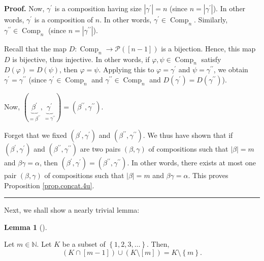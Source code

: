 \documentclass[numbers=enddot,12pt,final,onecolumn,notitlepage]{scrartcl}%
\theoremstyle{definition}
\newtheorem{lem}[theo]{Lemma}
\newenvironment{lemma}[1][]
{\begin{lem}[#1]\begin{leftbar}}
{\end{leftbar}\end{lem}}
\newenvironment{proof}[1][Proof]{\noindent\textbf{#1.} }{\ \rule{0.5em}{0.5em}}
\begin{document}
\begin{proof}
Now, $\gamma^{\prime}$ is a composition having size $\left\vert \gamma
^{\prime}\right\vert =n$ (since $n=\left\vert \gamma^{\prime}\right\vert $).
In other words, $\gamma^{\prime}$ is a composition of $n$. In other words,
$\gamma^{\prime}\in\operatorname*{Comp}\nolimits_{n}$. Similarly,
$\gamma^{\prime\prime}\in\operatorname*{Comp}\nolimits_{n}$ (since
$n=\left\vert \gamma^{\prime\prime}\right\vert $).

Recall that the map $D:\operatorname*{Comp}\nolimits_{n}\rightarrow
\mathcal{P}\left(  \left[  n-1\right]  \right)  $ is a bijection. Hence, this
map $D$ is bijective, thus injective. In other words, if $\varphi,\psi
\in\operatorname*{Comp}\nolimits_{n}$ satisfy $D\left(  \varphi\right)
=D\left(  \psi\right)  $, then $\varphi=\psi$. Applying this to $\varphi
=\gamma^{\prime}$ and $\psi=\gamma^{\prime\prime}$, we obtain $\gamma^{\prime
}=\gamma^{\prime\prime}$ (since $\gamma^{\prime}\in\operatorname*{Comp}%
\nolimits_{n}$ and $\gamma^{\prime\prime}\in\operatorname*{Comp}\nolimits_{n}$
and $D\left(  \gamma^{\prime}\right)  =D\left(  \gamma^{\prime\prime}\right)
$).

Now, $\left(  \underbrace{\beta^{\prime}}_{=\beta^{\prime\prime}%
},\underbrace{\gamma^{\prime}}_{=\gamma^{\prime\prime}}\right)  =\left(
\beta^{\prime\prime},\gamma^{\prime\prime}\right)  $.

Forget that we fixed $\left(  \beta^{\prime},\gamma^{\prime}\right)  $ and
$\left(  \beta^{\prime\prime},\gamma^{\prime\prime}\right)  $. We thus have
shown that if $\left(  \beta^{\prime},\gamma^{\prime}\right)  $ and $\left(
\beta^{\prime\prime},\gamma^{\prime\prime}\right)  $ are two pairs $\left(
\beta,\gamma\right)  $ of compositions such that $\left\vert \beta\right\vert
=m$ and $\beta\gamma=\alpha$, then $\left(  \beta^{\prime},\gamma^{\prime
}\right)  =\left(  \beta^{\prime\prime},\gamma^{\prime\prime}\right)  $. In
other words, there exists at most one pair $\left(  \beta,\gamma\right)  $ of
compositions such that $\left\vert \beta\right\vert =m$ and $\beta
\gamma=\alpha$. This proves Proposition \ref{prop.concat.4u}.
\end{proof}

Next, we shall show a nearly trivial lemma:

\begin{lemma}
\label{lem.concat.4a.1}Let $m\in\mathbb{N}$. Let $K$ be a subset of $\left\{
1,2,3,\ldots\right\}  $. Then,
\[
\left(  K\cap\left[  m-1\right]  \right)  \cup\left(  K\setminus\left[
m\right]  \right)  =K\setminus\left\{  m\right\}  .
\]

\end{lemma}
\end{document}
